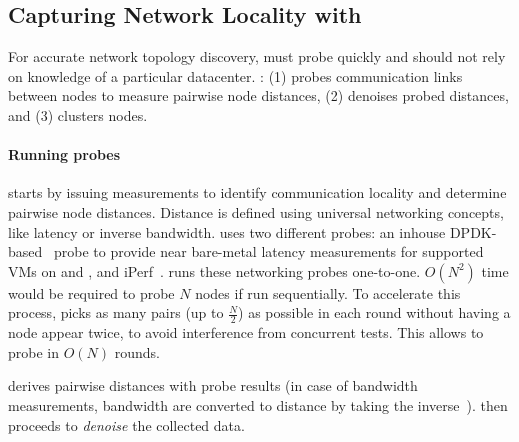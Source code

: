 \subsection{Capturing Network Locality with \marcopolo}
\label{sec:marcopolo}
For accurate network topology discovery, \marcopolo must probe quickly and should not rely on knowledge of a particular datacenter. \marcopolo: (1) probes communication links between nodes to measure pairwise node distances, (2) denoises probed distances, and (3) clusters nodes.

\paragraph{Running \marcopolo probes}

\marcopolo starts by issuing measurements to identify communication locality and determine pairwise node distances. Distance is defined using universal networking concepts, like latency or inverse bandwidth. \marcopolo uses two different probes: an inhouse DPDK-based~\cite{HomeDPDK74:online} probe to provide near bare-metal latency measurements for supported VMs on \azure and \ectwo, and iPerf~\cite{iPerfThe0:online}. \marcopolo runs these networking probes one-to-one. $O(N^2)$ time would be required to probe $N$ nodes if run sequentially. To accelerate this process, \marcopolo picks as many pairs (up to $\frac{N}{2}$) as possible in each round without having a node appear twice, to avoid interference from concurrent tests. This allows \marcopolo to probe in $O(N)$ rounds.


\marcopolo derives pairwise distances with probe results (in case of bandwidth measurements, bandwidth are converted to distance by taking the inverse~\cite{affinity2Distance}). \marcopolo then proceeds to \textit{denoise} the collected data. %

